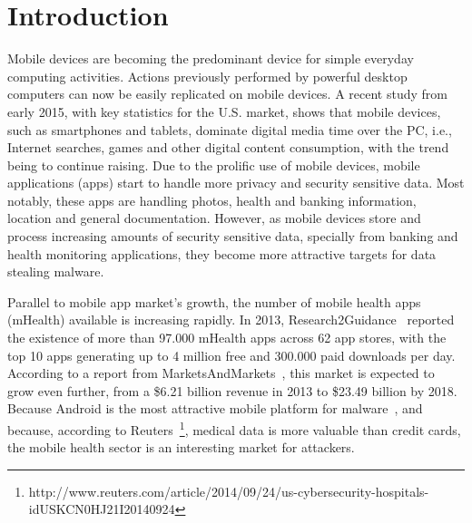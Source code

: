 
% 
% 
\section{Introduction}



Mobile devices are becoming the predominant device for simple everyday computing activities. Actions previously performed by powerful desktop computers can now be easily replicated on mobile devices. A recent study \cite{comscore} from early 2015, with key statistics for the U.S. market, shows that mobile devices, such as smartphones and tablets, dominate digital media time over the \ac{PC}, i.e., Internet searches, games and other digital content consumption, with the trend being to continue raising. Due to the prolific use of mobile devices, mobile applications (apps) start to handle more privacy and security sensitive data. Most notably, these apps are handling photos, health and banking information, location and general documentation. However, as mobile devices store and process increasing amounts of security sensitive data, specially from banking and health monitoring applications, they become more attractive targets for data stealing malware.

Parallel to mobile app market's growth, the number of mobile health apps (mHealth) available is increasing rapidly. In 2013, Research2Guidance~\cite{research2guidance} reported the existence of more than 97.000 mHealth apps across 62 app stores, with the top 10 apps generating up to 4 million free and 300.000 paid downloads per day. According to a report from MarketsAndMarkets~\cite{marketsandmarkets}, this market is expected to grow even further, from a \$6.21 billion revenue in 2013 to \$23.49 billion by 2018. Because Android is the most attractive mobile platform for malware~\cite{fsecure}, and because, according to Reuters~\footnote{http://www.reuters.com/article/2014/09/24/us-cybersecurity-hospitals-idUSKCN0HJ21I20140924}, medical data is more valuable than credit cards, the mobile health sector is an interesting market for attackers.

